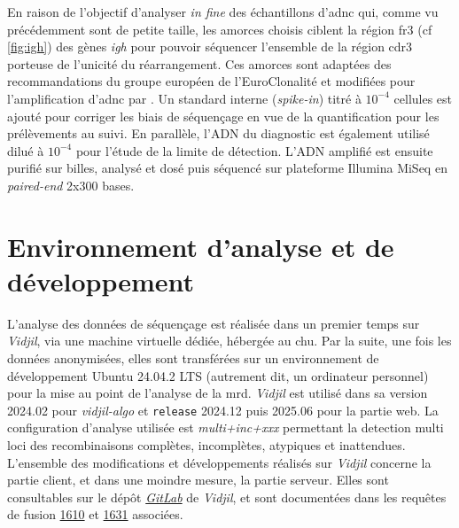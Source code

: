En raison de l'objectif d'analyser \textit{in fine} des échantillons d'\gls{adnc} qui, comme vu précédemment sont de petite taille, 
les amorces choisis ciblent la région \gls{fr}3 (cf \autoref{fig:igh}) des gènes \textit{\gls{igh}} pour pouvoir séquencer l'ensemble de la 
région \gls{cdr}3 porteuse de l'unicité du réarrangement. 
Ces amorces sont adaptées des recommandations du groupe européen de l'EuroClonalité \cite{langerakEuroClonalityBIOMED2Guidelines2012} 
et modifiées pour l'amplification d'\gls{adnc} par \citeauthor{pottCfDNABasedNGSIG2022a} \cite{pottCfDNABasedNGSIG2022a}.
Un standard interne (\textit{spike-in}) titré à $10^{-4}$ cellules est ajouté pour corriger les biais de séquençage en vue de la quantification 
pour les prélèvements au suivi. En parallèle, l'ADN du diagnostic est également utilisé dilué à $10^{-4}$ pour l'étude de la limite de détection. 
L'ADN amplifié est ensuite purifié sur billes, analysé et dosé puis séquencé sur plateforme Illumina MiSeq en \textit{paired-end} 2x300 bases.

\section{Environnement d'analyse et de développement}

L'analyse des données de séquençage est réalisée dans un premier temps sur \textit{Vidjil}, via une machine virtuelle dédiée,
hébergée au \gls{chu}. Par la suite, une fois les données anonymisées, elles sont transférées sur un environnement de 
développement Ubuntu 24.04.2 LTS (autrement dit, un ordinateur personnel) pour la mise au point de l'analyse de la \gls{mrd}.
\textit{Vidjil} est utilisé dans sa version 2024.02 pour \textit{vidjil-algo} et \texttt{release} 2024.12 puis 2025.06 pour la partie 
web. La configuration d'analyse utilisée est \textit{multi+inc+xxx} permettant la detection multi loci des recombinaisons complètes, 
incomplètes, atypiques et inattendues.
L'ensemble des modifications et développements réalisés sur \textit{Vidjil} concerne la partie client, et dans une moindre mesure,
la partie serveur. Elles sont consultables sur le dépôt \href{https://gitlab.inria.fr/users/x-benha/activity}{\textit{GitLab}}
de \textit{Vidjil}, et sont documentées dans les requêtes de fusion \href{https://gitlab.inria.fr/vidjil/vidjil/-/merge_requests/1610}{1610}
et \href{https://gitlab.inria.fr/vidjil/vidjil/-/merge_requests/1631}{1631} associées.

